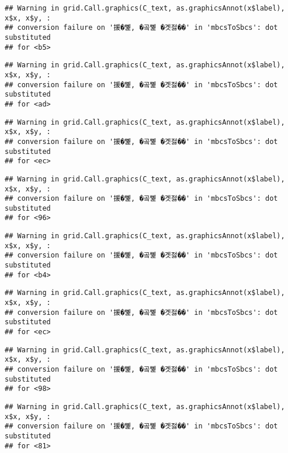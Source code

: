 \documentclass[
]{article}
\begin{document}
\begin{verbatim}
## Warning in grid.Call.graphics(C_text, as.graphicsAnnot(x$label), x$x, x$y, :
## conversion failure on '援�뼱, �곸뼱 �곗젏��' in 'mbcsToSbcs': dot substituted
## for <b5>
\end{verbatim}

\begin{verbatim}
## Warning in grid.Call.graphics(C_text, as.graphicsAnnot(x$label), x$x, x$y, :
## conversion failure on '援�뼱, �곸뼱 �곗젏��' in 'mbcsToSbcs': dot substituted
## for <ad>
\end{verbatim}

\begin{verbatim}
## Warning in grid.Call.graphics(C_text, as.graphicsAnnot(x$label), x$x, x$y, :
## conversion failure on '援�뼱, �곸뼱 �곗젏��' in 'mbcsToSbcs': dot substituted
## for <ec>
\end{verbatim}

\begin{verbatim}
## Warning in grid.Call.graphics(C_text, as.graphicsAnnot(x$label), x$x, x$y, :
## conversion failure on '援�뼱, �곸뼱 �곗젏��' in 'mbcsToSbcs': dot substituted
## for <96>
\end{verbatim}

\begin{verbatim}
## Warning in grid.Call.graphics(C_text, as.graphicsAnnot(x$label), x$x, x$y, :
## conversion failure on '援�뼱, �곸뼱 �곗젏��' in 'mbcsToSbcs': dot substituted
## for <b4>
\end{verbatim}

\begin{verbatim}
## Warning in grid.Call.graphics(C_text, as.graphicsAnnot(x$label), x$x, x$y, :
## conversion failure on '援�뼱, �곸뼱 �곗젏��' in 'mbcsToSbcs': dot substituted
## for <ec>
\end{verbatim}

\begin{verbatim}
## Warning in grid.Call.graphics(C_text, as.graphicsAnnot(x$label), x$x, x$y, :
## conversion failure on '援�뼱, �곸뼱 �곗젏��' in 'mbcsToSbcs': dot substituted
## for <98>
\end{verbatim}

\begin{verbatim}
## Warning in grid.Call.graphics(C_text, as.graphicsAnnot(x$label), x$x, x$y, :
## conversion failure on '援�뼱, �곸뼱 �곗젏��' in 'mbcsToSbcs': dot substituted
## for <81>
\end{verbatim}
\end{document}
